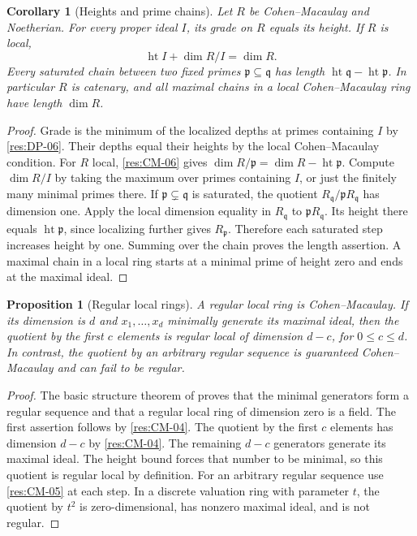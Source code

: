 \documentclass[11pt,oneside,openany]{book}
\newtheorem{proposition}[theorem]{Proposition}
\newtheorem{corollary}[theorem]{Corollary}
\theoremstyle{definition}
\theoremstyle{remark}
\begin{document}
\begin{corollary}[Heights and prime chains]\label{res:CM-07}
Let $R$ be Cohen--Macaulay and Noetherian. For every proper
ideal $I$, its grade on $R$ equals its height. If $R$ is local,
\[
 \operatorname{ht} I+\dim R/I=\dim R .
\]
Every saturated chain between two fixed primes
$\mathfrak p\subseteq\mathfrak q$ has length
$\operatorname{ht}\mathfrak q-\operatorname{ht}\mathfrak p$.
In particular $R$ is catenary, and all maximal chains in a
local Cohen--Macaulay ring have length $\dim R$.
\end{corollary}
\begin{proof}
Grade is the minimum of the localized depths at primes
containing $I$ by \ref{res:DP-06}. Their depths equal their heights by
the local Cohen--Macaulay condition. For $R$ local,
\ref{res:CM-06} gives
$\dim R/\mathfrak p=\dim R-\operatorname{ht}\mathfrak p$.
Compute $\dim R/I$ by taking the maximum over primes
containing $I$, or just the finitely many minimal primes there.
If $\mathfrak p\subsetneq\mathfrak q$ is saturated, the quotient
$R_{\mathfrak q}/\mathfrak pR_{\mathfrak q}$ has dimension one.
Apply the local dimension equality in $R_{\mathfrak q}$ to
$\mathfrak pR_{\mathfrak q}$. Its height there equals
$\operatorname{ht}\mathfrak p$, since localizing further gives
$R_{\mathfrak p}$. Therefore each saturated step increases
height by one. Summing over the chain proves the length assertion.
A maximal chain in a local ring starts at a minimal prime of
height zero and ends at the maximal ideal.
\end{proof}

\begin{proposition}[Regular local rings]\label{res:CM-08}
A regular local ring is Cohen--Macaulay. If its dimension is
$d$ and $x_1,\ldots,x_d$ minimally generate its maximal ideal,
then the quotient by the first $c$ elements is regular local
of dimension $d-c$, for $0\le c\le d$. In contrast, the
quotient by an arbitrary regular sequence is guaranteed
Cohen--Macaulay and can fail to be regular.
\end{proposition}
\begin{proof}
The basic structure theorem of \cite[ALG-05-C03-S03]{p103}
proves that the minimal generators form a regular sequence
and that a regular local ring of dimension zero is a field.
The first assertion follows by \ref{res:CM-04}.
The quotient by the first $c$ elements has dimension $d-c$
by \ref{res:CM-04}. The remaining $d-c$ generators generate
its maximal ideal. The height bound forces that number to
be minimal, so this quotient is regular local by definition.
For an arbitrary regular sequence use \ref{res:CM-05}
at each step. In a discrete valuation ring with parameter
$t$, the quotient by $t^2$ is zero-dimensional, has nonzero
maximal ideal, and is not regular.
\end{proof}
\end{document}
